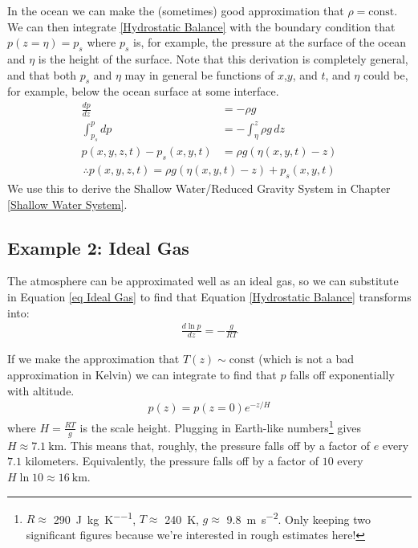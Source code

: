 In the ocean we can make the (sometimes) good approximation that \(\rho=\text{const}\). We can then integrate \ref{Hydrostatic Balance} with the boundary condition that \(p(z=\eta)=p_s\) where \(p_s\) is, for example, the pressure at the surface of the ocean and \(\eta\) is the height of the surface. Note that this derivation is completely general, and that both \(p_s\) and \(\eta\) may in general be functions of \(x\),\(y\), and \(t\), and \(\eta\) could be, for example, below the ocean surface at some interface.
\begin{align*}
    \frac{d p}{d z}&=-\rho g\\
    \int_{p_s}^{p}dp&=-\int_{\eta}^{z}\rho g \, dz\\
    p(x,y,z,t)-p_s(x,y,t)&=\rho g (\eta(x,y,t)-z)
\end{align*}
\begin{align}
    \label{Const Density Hydrostatic}
    \therefore \boxed{p(x,y,z,t)=\rho g(\eta(x,y,t)-z)+p_s(x,y,t)}
\end{align}
We use this to derive the Shallow Water/Reduced Gravity System in Chapter \ref{Shallow Water System}.

\subsection{Example 2: Ideal Gas}\label{Example 2: Ideal Gas}

The atmosphere can be approximated well as an ideal gas, so we can substitute in Equation \ref{eq Ideal Gas} to find that Equation \ref{Hydrostatic Balance} transforms into:
\begin{align}
    \label{Hydrostatic Balance Ideal}
    \boxed{\frac{d\ln p}{dz}=-\frac{g}{RT}}
\end{align}

If we make the approximation that \(T(z)\sim\text{const}\) (which is not a bad approximation in Kelvin) we can integrate to find that \(p\) falls off exponentially with altitude.
\begin{align*}
    p(z)=p(z=0)e^{-z/H}
\end{align*}
where \(H=\frac{RT}{g}\) is the scale height. Plugging in Earth-like numbers\footnote{
    \(R\approx\) \qty{290}{\joule\per\kilogram\per\kelvin}, \(T\approx\) \qty{240}{\kelvin}, \(g\approx\) \qty{9.8}{\meter\per\square\second}. Only keeping two significant figures because we're interested in rough estimates here!
} gives \(H\approx\qty{7.1}{\kilo\meter}\). This means that, roughly, the pressure falls off by a factor of \(e\) every \(7.1\) kilometers. Equivalently, the pressure falls off by a factor of \(10\) every \(H\ln 10\approx\qty{16}{\kilo\meter}\).

